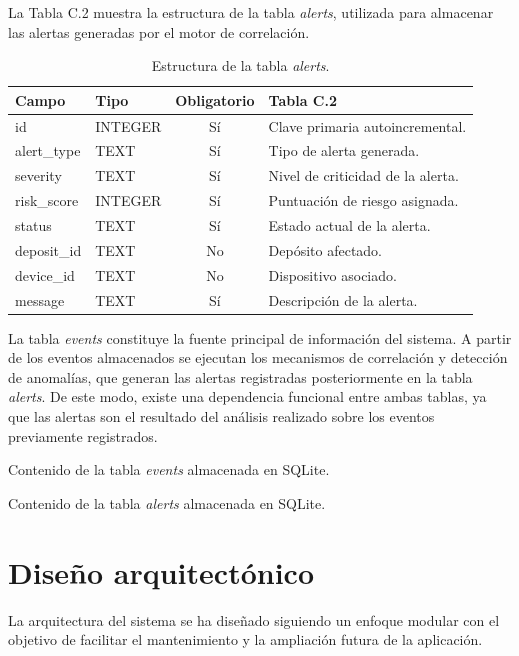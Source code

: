 La Tabla C.2 muestra la estructura de la tabla \textit{alerts}, utilizada para almacenar las alertas generadas por el motor de correlación.

\begin{table}[htbp]
	\centering
	\small
	\begin{tabular}{|l|l|c|p{4cm}|}
		\hline
		\textbf{Campo} & \textbf{Tipo} & \textbf{Obligatorio} & \textbf{Tabla C.2} \\
		\hline
		id & INTEGER & Sí & Clave primaria autoincremental. \\
		alert\_type & TEXT & Sí & Tipo de alerta generada. \\
		severity & TEXT & Sí & Nivel de criticidad de la alerta. \\
		risk\_score & INTEGER & Sí & Puntuación de riesgo asignada. \\
		status & TEXT & Sí & Estado actual de la alerta. \\
		deposit\_id & TEXT & No & Depósito afectado. \\
		device\_id & TEXT & No & Dispositivo asociado. \\
		message & TEXT & Sí & Descripción de la alerta. \\
		\hline
	\end{tabular}
	\caption{Estructura de la tabla \textit{alerts}.}
\end{table}

La tabla \textit{events} constituye la fuente principal de información del sistema. A partir de los eventos almacenados se ejecutan los mecanismos de correlación y detección de anomalías, que generan las alertas registradas posteriormente en la tabla \textit{alerts}. De este modo, existe una dependencia funcional entre ambas tablas, ya que las alertas son el resultado del análisis realizado sobre los eventos previamente registrados.

{Contenido de la tabla \textit{events} almacenada en SQLite.}

{Contenido de la tabla \textit{alerts} almacenada en SQLite.}

\section{Diseño arquitectónico}

La arquitectura del sistema se ha diseñado siguiendo un enfoque modular con el objetivo de facilitar el mantenimiento y la ampliación futura de la aplicación.

